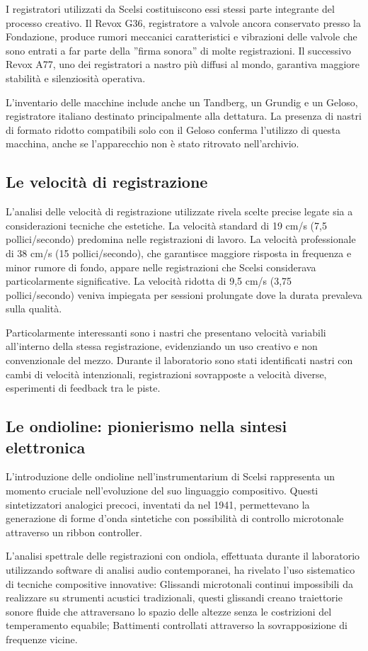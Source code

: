 I registratori utilizzati da Scelsi costituiscono essi stessi parte integrante del processo creativo. Il Revox G36, registratore a valvole ancora conservato presso la Fondazione, produce rumori meccanici caratteristici e vibrazioni delle valvole che sono entrati a far parte della ''firma sonora'' di molte registrazioni. Il successivo Revox A77, uno dei registratori a nastro più diffusi al mondo, garantiva maggiore stabilità e silenziosità operativa.

L'inventario delle macchine include anche un Tandberg, un Grundig e un Geloso, registratore italiano destinato principalmente alla dettatura. La presenza di nastri di formato ridotto compatibili solo con il Geloso conferma l'utilizzo di questa macchina, anche se l'apparecchio non è stato ritrovato nell'archivio.
\subsection{Le velocità di registrazione}
L'analisi delle velocità di registrazione utilizzate rivela scelte precise legate sia a considerazioni tecniche che estetiche. La velocità standard di 19 cm/s (7,5 pollici/secondo) predomina nelle registrazioni di lavoro. La velocità professionale di 38 cm/s (15 pollici/secondo), che garantisce maggiore risposta in frequenza e minor rumore di fondo, appare nelle registrazioni che Scelsi considerava particolarmente significative. La velocità ridotta di 9,5 cm/s (3,75 pollici/secondo) veniva impiegata per sessioni prolungate dove la durata prevaleva sulla qualità.

Particolarmente interessanti sono i nastri che presentano velocità variabili all'interno della stessa registrazione, evidenziando un uso creativo e non convenzionale del mezzo. Durante il laboratorio sono stati identificati nastri con cambi di velocità intenzionali, registrazioni sovrapposte a velocità diverse, esperimenti di feedback tra le piste.
\subsection{Le ondioline: pionierismo nella sintesi elettronica}
L'introduzione delle ondioline nell'instrumentarium di Scelsi rappresenta un momento cruciale nell'evoluzione del suo linguaggio compositivo. Questi sintetizzatori analogici precoci, inventati da  nel 1941, permettevano la generazione di forme d'onda sintetiche con possibilità di controllo microtonale attraverso un ribbon controller\cite{Fourier1994}.

L'analisi spettrale delle registrazioni con ondiola, effettuata durante il laboratorio utilizzando software di analisi audio contemporanei, ha rivelato l'uso sistematico di tecniche compositive innovative: Glissandi microtonali continui impossibili da realizzare su strumenti acustici tradizionali, questi glissandi creano traiettorie sonore fluide che attraversano lo spazio delle altezze senza le costrizioni del temperamento equabile; Battimenti controllati attraverso la sovrapposizione di frequenze vicine.

